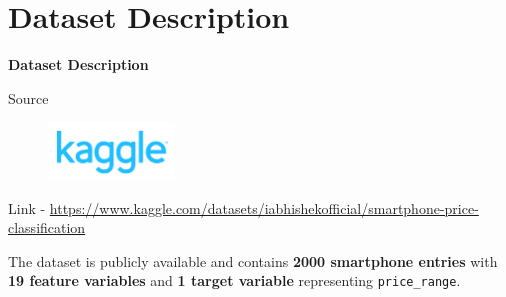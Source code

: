 \documentclass[14pt, aspectratio=169]{beamer}
\begin{document}
\section{Dataset Description}
\begin{frame}{}
  \Huge
  \centering
  \textbf{Dataset Description}
  \normalsize
\end{frame}
\begin{frame}{Source}
  \begin{figure}[H]
    \centering
    \includegraphics[width=0.3\textwidth]{kaggle.png}
  \end{figure}
  Link - \footnotesize \href{https://www.kaggle.com/datasets/iabhishekofficial/mobile-price-classification?select=train.csv}{https://www.kaggle.com/datasets/iabhishekofficial/smartphone-price-classification}\\
  \normalsize
  
  The dataset is publicly available and contains \textbf{2000 smartphone entries} with \textbf{19 feature variables} and \textbf{1 target variable} representing \texttt{price\_range}.
\end{frame}
\end{document}
